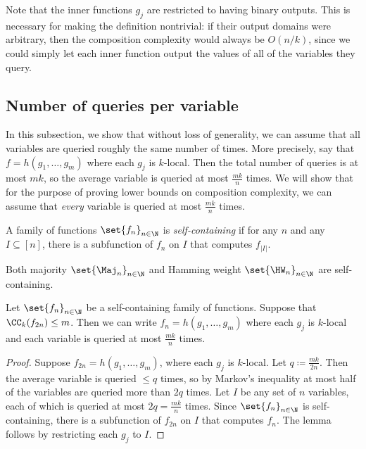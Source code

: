 \begin{remark}
Note that the inner functions $g_j$ are restricted to having binary outputs.
This is necessary for making the definition nontrivial: if their output domains were arbitrary, then the composition complexity would always be $O(n/k)$,
since we could simply let each inner function output the values of all of the variables they query.
\end{remark}

\subsection{Number of queries per variable}
In this subsection, we show that without loss of generality, we can assume that all variables are queried roughly the same number of times.
More precisely, say that $f = h(g_1, \ldots, g_m)$ where each $g_j$ is $k$-local.
Then the total number of queries is at most $mk$, so the average variable is queried at most $\frac{mk}{n}$ times.
We will show that for the purpose of proving lower bounds on composition complexity, we can assume that \emph{every} variable is queried at most $\frac{mk}{n}$ times.

\begin{definition}
A family of functions $\set{f_n}_{n \in \N}$ is \emph{self-containing} if for any $n$ and any $I \subseteq [n]$, there is a subfunction of $f_n$ on $I$ that computes $f_{|I|}$.
\end{definition}

\begin{fact}
Both majority $\set{\Maj_n}_{n \in \N}$ and Hamming weight $\set{\HW_n}_{n \in \N}$ are self-containing.%
\end{fact}


\begin{lemma}
\label{lemma:wlog}
Let $\set{f_n}_{n \in \N}$ be a self-containing family of functions.
Suppose that $\CC_k(f_{2n}) \leq m$.
Then we can write $f_n = h(g_1, \ldots, g_m)$ where each $g_j$ is $k$-local and each variable is queried at most $\frac{mk}{n}$ times.
\end{lemma}

\begin{proof}
Suppose $f_{2n} = h(g_1, \ldots, g_m)$, where each $g_j$ is $k$-local.
Let $q \coloneqq \frac{mk}{2n}$.
Then the average variable is queried $\leq q$ times, so by Markov's inequality at most half of the variables are queried more than $2q$ times.
Let $I$ be any set of $n$ variables, each of which is queried at most $2q = \frac{mk}{n}$ times.
Since $\set{f_n}_{n \in \N}$ is self-containing, there is a subfunction of $f_{2n}$ on $I$ that computes $f_n$.
The lemma follows by restricting each $g_j$ to $I$.
\end{proof}

